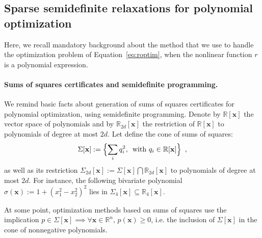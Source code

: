 \documentclass[preprint]{sigplanconf}
\newcommand{\R}{\mathbb{R}}
\newcommand{\x}{\mathbf{x}}
\theoremstyle{plain}
\begin{document}
\subsection{Sparse semidefinite relaxations for polynomial optimization}
\label{sec:sdpbackground}
Here, we recall mandatory background about the method that we use to handle the optimization problem of Equation~\eqref{eq:roptim}, when the nonlinear function $r$ is a polynomial expression.

\paragraph{Sums of squares certificates and semidefinite programming.}
We remind basic facts about generation of sums of squares certificates for polynomial optimization, using semidefinite programming.
Denote by $\R[\x]$ the vector space of polynomials and by $\R_{2 d}[\x]$ the restriction of $\R[\x]$ to polynomials of degree at most $2 d$. Let define the cone of sums of squares:
\begin{equation}
\label{eq:cone_sos}
\Sigma[\x] := \Bigl\{\sum_i q_i^2, \, \text{ with } q_i \in \R[\x] \Bigr\}\enspace,
\end{equation}
%
as well as its restriction $\Sigma_{2 d}[\x] := \Sigma[\x] \bigcap \R_{2 d}[\x]$ to polynomials of degree at most $2 d$. For instance, the following bivariate polynomial  $\sigma (\x) := 1 + (x_1^2 - x_2^2)^2$ lies in $\Sigma_4[\x] \subseteq \R_4[\x]$.

At some point, optimization methods based on sums of squares use the implication $p \in \Sigma[\x] \implies \forall \x \in \R^n, \, p(\x) \geq 0$, i.e. the inclusion of $\Sigma[\x]$ in the cone of nonnegative polynomials.
\end{document}
